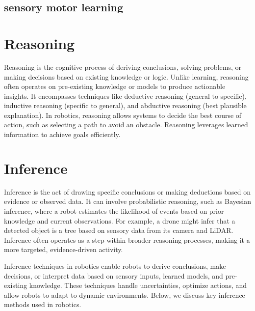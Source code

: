 \subsection{sensory motor learning}

\section{Reasoning}
Reasoning is the cognitive process of deriving conclusions, solving problems, or making decisions based on existing knowledge or logic. Unlike learning, reasoning often operates on pre-existing knowledge or models to produce actionable insights. It encompasses techniques like deductive reasoning (general to specific), inductive reasoning (specific to general), and abductive reasoning (best plausible explanation). In robotics, reasoning allows systems to decide the best course of action, such as selecting a path to avoid an obstacle. Reasoning leverages learned information to achieve goals efficiently. \cite{russell-2010-artificial-intelligence}

\section{Inference}
Inference is the act of drawing specific conclusions or making deductions based on evidence or observed data. It can involve probabilistic reasoning, such as Bayesian inference, where a robot estimates the likelihood of events based on prior knowledge and current observations. For example, a drone might infer that a detected object is a tree based on sensory data from its camera and LiDAR. Inference often operates as a step within broader reasoning processes, making it a more targeted, evidence-driven activity. \cite{bishop-2006-pattern-recognition}

Inference techniques in robotics enable robots to derive conclusions, make decisions, or interpret data based on sensory inputs, learned models, and pre-existing knowledge. These techniques handle uncertainties, optimize actions, and allow robots to adapt to dynamic environments. Below, we discuss key inference methods used in robotics.



